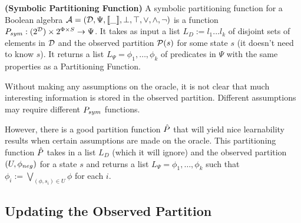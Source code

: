 \begin{definition}
\textbf{(Symbolic Partitioning Function)} 
A symbolic partitioning function for a Boolean algebra $\mathcal{A} = (\mathcal{D}, \Psi, \llbracket \_ \rrbracket, \bot, \top, \vee, \wedge, \neg)$ is a function $P_{sym} : (2^{\mathcal{D}})\times 2^{\Phi \times S} \rightarrow \Psi$.
It takes as input a list $L_D := l_1 . . . l_k$ of disjoint sets of elements in $\mathcal{D}$ and  the observed partition $\mathcal{P}(s)$ for some state $s$ (it doesn't need to know $s$).   %
It returns a list $L_\Psi = \phi_1, \dots, \phi_k$ of predicates in $\Psi$ with the same properties as a Partitioning Function. 
\end{definition}

Without making any assumptions on the oracle, it is not clear that much interesting information is stored in the observed partition. 
Different assumptions may require different $P_{sym}$ functions. 

However, there is a good partition function $\hat{P}$ that will yield nice learnability results when certain assumptions are made on the oracle. 
This partitioning function $\hat{P}$ takes in a list $L_D$ (which it will ignore) and the observed partition $(U, \phi_{neg})$ for a state $s$ and returns a list $L_\Psi = \phi_1, \dots, \phi_k$ such that $\phi_i := \bigvee_{(\phi, s_i) \in U}  \phi$ for each $i$.





\subsection{Updating the Observed Partition}

